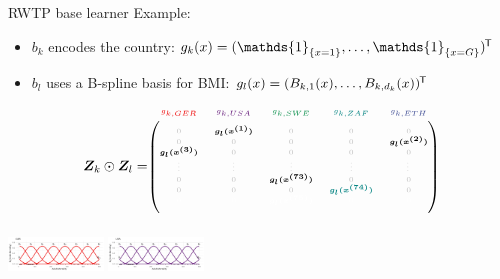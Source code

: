 \documentclass[t,10pt]{beamer}
\begin{document}
\begin{frame}{RWTP base learner}
  Example:
  \begin{itemize}
    \item $b_k$ encodes the country: $g_k(x) = (\mathds{1}_{\{x = 1\}}, \dots, \mathds{1}_{\{x = G\}})^\tran$
    \item $b_l$ uses a B-spline basis for BMI: $g_l(x) = (B_{k,1}(x), \dots, B_{k,d_k}(x))^{\mkern-1.5mu\mathsf{T}}$
  \end{itemize}
  $$
    \design_k \odot \design_l = \tiny\begin{blockarray}{ccccc}
      \color[HTML]{EE0000}g_{k,GER} & \color[HTML]{631879}g_{k,USA} & \color[HTML]{008B45}g_{k,SWE} & \color[HTML]{008280}g_{k,ZAF} & \color[HTML]{3B4992}g_{k,ETH}\\
    \begin{block}{(ccccc)}
      \phantom{x}\\
      \color{lightgray}0 & \color{black}\bm{g_l(x^{(1)})} & \color{lightgray}0 & \color{lightgray}0 & \color{lightgray}0 \\
      \color{lightgray}0 & \color{lightgray}0 & \color{lightgray}0 & \color{lightgray}0 & \color{black}\bm{g_l(x^{(2)})} \\
      \color{black}\bm{g_l(x^{(3)})} & \color{lightgray}0 & \color{lightgray}0 & \color{lightgray}0 & \color{lightgray}0 \\
      \color{lightgray}\vdots & \color{lightgray}\vdots & \color{lightgray}\vdots & \color{lightgray}\vdots & \color{lightgray}\vdots \\
      \color{lightgray}0 & \color{lightgray}0 & \color{black}\bm{g_l(x^{(73)})} & \color{lightgray}0 & \color{lightgray}0 \\
      \color{lightgray}0 & \color{lightgray}0 & \color{lightgray}0 & \color[HTML]{008280}\bm{g_l(x^{(74)})} & \color{lightgray}0 \\
      \color{white}0 & \color{white}0 & \color{white}\bm{g_l(x^{(75)})} & \color{white}0 & \color{white}0 \\
      \phantom{x}\\
    \end{block}
  \end{blockarray}
  $$
  \normalsize
  {\includegraphics[width=0.19\textwidth]{figures/fig-bs0-GER.png}}
  {\includegraphics[width=0.19\textwidth]{figures/fig-bs0-USA.png}}

\end{frame}
\end{document}
